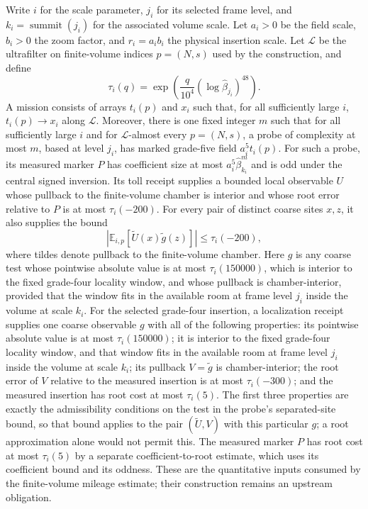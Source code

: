 Write $i$ for the scale parameter, $j_i$ for its selected frame level,
and $k_i=\operatorname{summit}(j_i)$ for the associated volume scale. Let $a_i>0$ be the field scale,
$b_i>0$ the zoom factor, and $r_i=a_i b_i$ the physical insertion scale.
Let $\mathcal L$ be the ultrafilter on finite-volume indices $p=(N,s)$ used
by the construction, and define
\[
 \tau_i(q)=\exp\!\left(\frac{q}{10^4}
      (\log\widehat\beta_{j_i})^{48}\right).
\]
A mission consists of arrays $t_i(p)$ and $x_i$ such that, for all
sufficiently large $i$, $t_i(p)\to x_i$ along $\mathcal L$. Moreover,
there is one fixed integer $m$ such that for all sufficiently large $i$ and
for $\mathcal L$-almost every $p=(N,s)$, a probe of complexity at most
$m$, based at level $j_i$, has marked grade-five field $a_i^5t_i(p)$.
For such a probe, its measured marker $P$ has coefficient size at most
$a_i^5\widehat\beta_{k_i}^{m}$ and is odd under the central signed
inversion. Its toll receipt supplies a bounded local observable $U$ whose
pullback to the finite-volume chamber is interior and whose root error
relative to $P$ is at most $\tau_i(-200)$. For every pair of distinct
coarse sites $x,z$, it also supplies the bound
\[
 |\mathbb E_{i,p}[\widetilde U(x)\widetilde g(z)]|\leq\tau_i(-200),
\]
where tildes denote pullback to the finite-volume chamber. Here $g$ is any
coarse test whose pointwise absolute value is at most $\tau_i(150000)$,
which is interior to the fixed grade-four locality window, and whose
pullback is chamber-interior, provided that the window fits in the
available room at frame level $j_i$ inside the volume at scale $k_i$. For
the selected grade-four insertion, a localization receipt supplies one
coarse observable $g$ with all of the following properties: its pointwise
absolute value is at most $\tau_i(150000)$; it is interior to the fixed
grade-four locality window, and that window fits in the available room at
frame level $j_i$ inside the volume at scale $k_i$; its pullback
$V=\widetilde g$ is chamber-interior; the root error of $V$ relative to
the measured insertion is at most $\tau_i(-300)$; and the measured
insertion has root cost at most $\tau_i(5)$. The first three properties
are exactly the admissibility conditions on the test in the probe's
separated-site bound, so that bound applies to the pair
$(\widetilde U,V)$ with this particular $g$; a root approximation alone
would not permit this. The measured marker $P$ has root cost at most
$\tau_i(5)$ by a separate coefficient-to-root estimate, which uses its
coefficient bound and its oddness. These are the quantitative inputs
consumed by the finite-volume mileage estimate; their construction remains
an upstream obligation.

